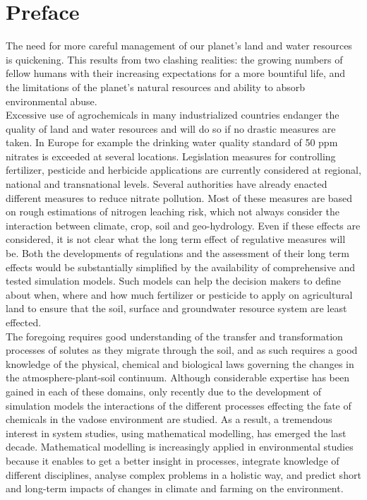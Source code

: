 \chapter{Preface}

The need for more careful management of our planet's land and water resources is quickening. This results from two clashing realities: the growing numbers of fellow humans with their increasing expectations for a more bountiful life, and the limitations of the planet's natural resources and ability to absorb environmental abuse.\\

Excessive use of agrochemicals in many industrialized countries endanger the quality of land and water resources and will do so if no drastic measures are taken. In Europe for example the drinking water quality standard of 50 ppm nitrates is exceeded at several locations. Legislation measures for controlling fertilizer, pesticide and herbicide applications are currently considered at regional, national and transnational levels. Several authorities have already enacted different measures to reduce nitrate pollution. Most of these measures are based on rough estimations of nitrogen leaching risk, which not always consider the interaction between climate, crop, soil and geo-hydrology. Even if these effects are considered, it is not clear what the long term effect of regulative measures will be. Both the developments of regulations and the assessment of their long term effects would be substantially simplified by the availability of comprehensive and tested simulation models. Such models can help the decision makers to define about when, where and how much fertilizer or pesticide to apply on agricultural land to ensure that the soil, surface and groundwater resource system are least effected.\\

The foregoing requires good understanding of the transfer and transformation processes of solutes as they migrate through the soil, and as such requires a good knowledge of the physical, chemical and biological laws governing the changes in the atmosphere-plant-soil continuum. Although considerable expertise has been gained in each of these domains, only recently due to the development of simulation models the interactions of the different processes effecting the fate of chemicals in the vadose environment are studied. As a result, a tremendous interest in system studies, using mathematical modelling, has emerged the last decade. Mathematical modelling is increasingly applied in environmental studies because it enables to get a better insight in processes, integrate knowledge of different disciplines, analyse complex problems in a holistic way, and predict short and long-term impacts of changes in climate and farming on the environment.\\

